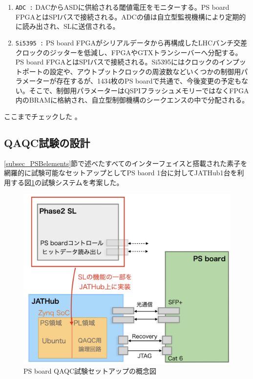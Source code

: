 \begin{enumerate}
    \item  \texttt{ADC :} DACからASDに供給される閾値電圧をモニターする。PS board FPGAとはSPIバスで接続される。ADCの値は自立型監視機構により定期的に読み出され、SLに送信される。
    \baselineskip

    \item \texttt{Si5395 :} PS board FPGAがシリアルデータから再構成したLHCバンチ交差クロックのジッターを低減し、FPGAやGTXトランシーバーへ分配する。PS board FPGAとはSPIバスで接続される。Si5395にはクロックのインプットポートの設定や、アウトプットクロックの周波数などいくつかの制御用パラメーターが存在するが、1434枚のPS boardで共通で、今後変更の予定もない。そこで、制御用パラメーターはQSPIフラッシュメモリーではなくFPGA内のBRAMに格納され、自立型制御機構のシークエンスの中で分配される。
    \baselineskip

\end{enumerate}

\begin{itembox}{ここまでチェックした}
    。
\end{itembox}

\subsection{QAQC試験の設計}
\label{subsec_QAQCdesign}
\ref{subsec_PSBelements}節で述べたすべてのインターフェイスと搭載された素子を網羅的に試験可能なセットアップとしてPS baord 1台に対してJATHub1台を利用する図\ref{PSBtestdesign}の試験システムを考案した。

\begin{figure} 
\centering
\includegraphics[width=16cm]{fig/QAQC/PSBtestdesign.png}
\caption[PS board QAQC試験セットアップの概念図]{PS board QAQC試験セットアップの概念図}
\label{PSBtestdesign}
\end{figure}

